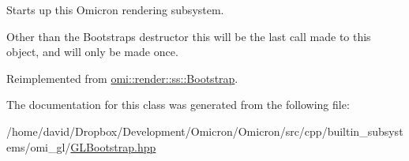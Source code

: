 Starts up this Omicron rendering subsystem. 

Other than the Bootstrap\textquotesingle{}s destructor this will be the last call made to this object, and will only be made once. 

Reimplemented from \hyperlink{classomi_1_1render_1_1ss_1_1_bootstrap_af4f13ba4968f7dac6141a7c558188aaf}{omi\+::render\+::ss\+::\+Bootstrap}.



The documentation for this class was generated from the following file\+:\begin{DoxyCompactItemize}
\item 
/home/david/\+Dropbox/\+Development/\+Omicron/\+Omicron/src/cpp/builtin\+\_\+subsystems/omi\+\_\+gl/\hyperlink{_g_l_bootstrap_8hpp}{G\+L\+Bootstrap.\+hpp}\end{DoxyCompactItemize}
